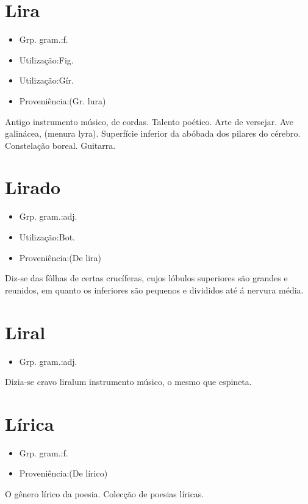 \section{Lira}
\begin{itemize}
\item {Grp. gram.:f.}
\end{itemize}
\begin{itemize}
\item {Utilização:Fig.}
\end{itemize}
\begin{itemize}
\item {Utilização:Gír.}
\end{itemize}
\begin{itemize}
\item {Proveniência:(Gr. \textunderscore lura\textunderscore )}
\end{itemize}
Antigo instrumento músico, de cordas.
Talento poético.
Arte de versejar.
Ave galinácea, (\textunderscore menura lyra\textunderscore ).
Superfície inferior da abóbada dos pilares do cérebro.
Constelação boreal.
Guitarra.
\section{Lirado}
\begin{itemize}
\item {Grp. gram.:adj.}
\end{itemize}
\begin{itemize}
\item {Utilização:Bot.}
\end{itemize}
\begin{itemize}
\item {Proveniência:(De \textunderscore lira\textunderscore )}
\end{itemize}
Diz-se das fôlhas de certas crucíferas, cujos lóbulos superiores são grandes e reunidos, em quanto os inferiores são pequenos e divididos até á nervura média.
\section{Liral}
\begin{itemize}
\item {Grp. gram.:adj.}
\end{itemize}
Dizia-se \textunderscore cravo liral\textunderscore  um instrumento músico, o mesmo que \textunderscore espineta\textunderscore .
\section{Lírica}
\begin{itemize}
\item {Grp. gram.:f.}
\end{itemize}
\begin{itemize}
\item {Proveniência:(De \textunderscore lírico\textunderscore )}
\end{itemize}
O gênero lírico da poesia.
Colecção de poesias líricas.
